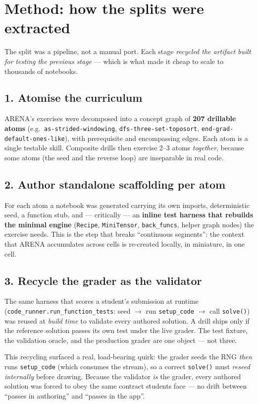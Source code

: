 \documentclass[11pt]{article}
\begin{document}
\section{Method: how the splits were extracted}

The split was a pipeline, not a manual port. Each stage \emph{recycled the artifact built for
testing the previous stage} --- which is what made it cheap to scale to thousands of notebooks.

\subsection*{1. Atomise the curriculum}
ARENA's exercises were decomposed into a concept graph of \textbf{207 drillable atoms} (e.g.\
\texttt{as-strided-windowing}, \texttt{dfs-three-set-toposort}, \texttt{end-grad-default-ones-like}),
with prerequisite and encompassing edges. Each atom is a single testable skill. Composite
drills then exercise 2--3 atoms \emph{together}, because some atoms (the seed and the reverse
loop) are inseparable in real code.

\subsection*{2. Author standalone scaffolding per atom}
For each atom a notebook was generated carrying its own imports, deterministic seed, a function
stub, and --- critically --- an \textbf{inline test harness that rebuilds the minimal engine}
(\texttt{Recipe}, \texttt{MiniTensor}, \texttt{back\_funcs}, helper graph nodes) the exercise
needs. This is the step that breaks ``continuous segments'': the context that ARENA accumulates
across cells is re-created locally, in miniature, in one cell.

\subsection*{3. Recycle the grader as the validator}
The same harness that scores a student's submission at runtime
(\texttt{code\_runner.run\_function\_tests}: seed $\to$ run \texttt{setup\_code} $\to$ call
\texttt{solve()}) was reused at \emph{build time} to validate every authored solution. A drill
ships only if the reference solution passes its own test under the live grader. The test
fixture, the validation oracle, and the production grader are one object --- not three.

This recycling surfaced a real, load-bearing quirk: the grader seeds the RNG \emph{then} runs
\texttt{setup\_code} (which consumes the stream), so a correct \texttt{solve()} must
\emph{reseed internally} before drawing. Because the validator \emph{is} the grader, every
authored solution was forced to obey the same contract students face --- no drift between
``passes in authoring'' and ``passes in the app''.
\end{document}
